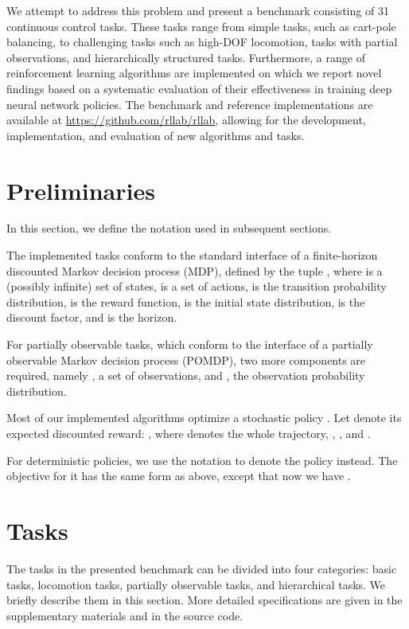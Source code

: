\documentclass{article}
\begin{document}
We attempt to address this problem and present a benchmark consisting of 31 continuous control tasks. These tasks range from simple tasks, such as cart-pole balancing, to challenging tasks such as high-DOF locomotion, tasks with partial observations, and hierarchically structured tasks. Furthermore, a range of reinforcement learning algorithms are implemented on which we report novel findings based on a systematic evaluation of their effectiveness in training deep neural network policies. The benchmark and reference implementations are available at \url{https://github.com/rllab/rllab}, allowing for the development, implementation, and evaluation of new algorithms and tasks. 



\section{Preliminaries}
\label{section:preliminaries}

In this section, we define the notation used in subsequent sections.

The implemented tasks conform to the standard interface of a finite-horizon discounted Markov decision process (MDP), defined by the tuple , where  is a (possibly infinite) set of states,  is a set of actions,  is the transition probability distribution,   is the reward function,  is the initial state distribution,  is the discount factor, and  is the horizon.

For partially observable tasks, which conform to the interface of a partially observable Markov decision process (POMDP), two more components are required, namely , a set of observations, and , the observation probability distribution.

Most of our implemented algorithms optimize a stochastic policy . Let  denote its expected discounted reward: 
, where  denotes the whole trajectory, , , and .

For deterministic policies, we use the notation  to denote the policy instead. The objective for it has the same form as above, except that now we have .


\section{Tasks}

The tasks in the presented benchmark can be divided into four categories: basic tasks, locomotion tasks, partially observable tasks, and hierarchical tasks.
We briefly describe them in this section.
More detailed specifications are given in the supplementary materials and in the source code.
\end{document}
